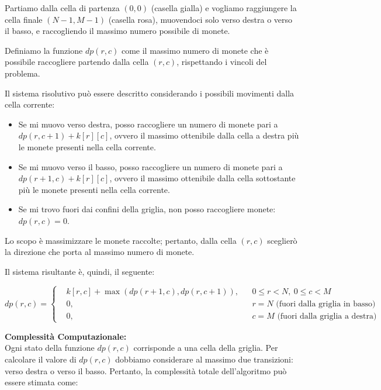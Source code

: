 Partiamo dalla cella di partenza $(0,0)$ (casella gialla) e vogliamo raggiungere la cella finale $(N-1, M-1)$ (casella rosa), muovendoci solo verso destra o verso il basso, e raccogliendo il massimo numero possibile di monete.

Definiamo la funzione $dp(r,c)$ come il massimo numero di monete che è possibile raccogliere partendo dalla cella $(r,c)$, rispettando i vincoli del problema.  

Il sistema risolutivo può essere descritto considerando i possibili movimenti dalla cella corrente:

\begin{itemize}
	\item Se mi muovo verso destra, posso raccogliere un numero di monete pari a $dp(r, c+1) + k[r][c]$, ovvero il massimo ottenibile dalla cella a destra più le monete presenti nella cella corrente.
	\item Se mi muovo verso il basso, posso raccogliere un numero di monete pari a $dp(r+1, c) + k[r][c]$, ovvero il massimo ottenibile dalla cella sottostante più le monete presenti nella cella corrente.
	\item Se mi trovo fuori dai confini della griglia, non posso raccogliere monete: $dp(r,c) = 0$.
\end{itemize}

Lo scopo è massimizzare le monete raccolte; pertanto, dalla cella $(r,c)$ sceglierò la direzione che porta al massimo numero di monete.  

Il sistema risultante è, quindi, il seguente:

\begin{equation}
	dp(r,c) =
	\left\{
	\begin{aligned}
		& k[r,c] + \max(dp(r+1, c), dp(r, c+1)), && 0 \le r < N, \ 0 \le c < M\\
		& 0, && r = N \text{ (fuori dalla griglia in basso)}\\
		& 0, && c = M \text{ (fuori dalla griglia a destra)}
	\end{aligned}
	\right.
	\label{eq:sistema_griglia-monete}
\end{equation}

\bigskip
\noindent \textbf{Complessità Computazionale:} \\
Ogni stato della funzione $dp(r,c)$ corrisponde a una cella della griglia. Per calcolare il valore di $dp(r,c)$ dobbiamo considerare al massimo due transizioni: verso destra o verso il basso.  
Pertanto, la complessità totale dell'algoritmo può essere stimata come:


